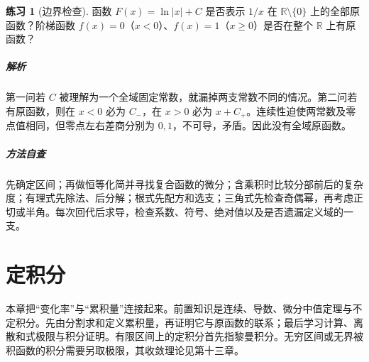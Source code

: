 \documentclass[UTF8,fontset=fandol,12pt,oneside,openany]{ctexrep}
\newcommand{\R}{\mathbb R}
\theoremstyle{definition}
\newtheorem{exercise}{练习}[chapter]
\begin{document}
\begin{exercise}[边界检查]
函数 $F(x)=\ln|x|+C$ 是否表示 $1/x$ 在 $\R\setminus\{0\}$ 上的全部原函数？阶梯函数 $f(x)=0$（$x<0$）、$f(x)=1$（$x\ge0$）是否在整个 $\R$ 上有原函数？
\end{exercise}
\paragraph{解析}第一问若 $C$ 被理解为一个全域固定常数，就漏掉两支常数不同的情况。第二问若有原函数，则在 $x<0$ 必为 $C_-$，在 $x>0$ 必为 $x+C_+$。连续性迫使两常数及零点值相同，但零点左右差商分别为 $0,1$，不可导，矛盾。因此没有全域原函数。

\paragraph{方法自查}先确定区间；再做恒等化简并寻找复合函数的微分；含乘积时比较分部前后的复杂度；有理式先除法、后分解；根式先配方和选支；三角式先检查奇偶幂，再考虑正切或半角。每次回代后求导，检查系数、符号、绝对值以及是否遗漏定义域的一支。


\chapter{定积分}
\label{lec:11:chapter}
本章把“变化率”与“累积量”连接起来。前置知识是连续、导数、微分中值定理与不定积分。先由分割求和定义累积量，再证明它与原函数的联系；最后学习计算、离散和式极限与积分证明。有限区间上的定积分首先指黎曼积分。无穷区间或无界被积函数的积分需要另取极限，其收敛理论见第十三章。
\end{document}
